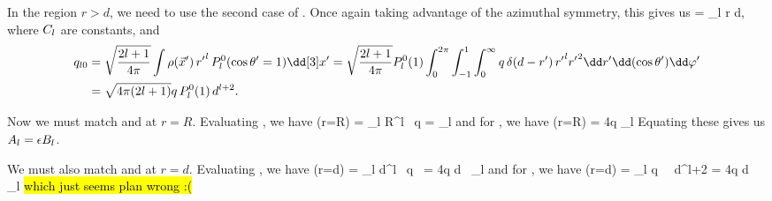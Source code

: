 \begin{solution}
	In the region $r > d$, we need to use the second case of .  Once again taking advantage of the azimuthal symmetry, this gives us
	\beqn \label{C}
		\phix = \sum_l \Cl {}  \Ylotv \quad \tif r \geq d,
	\eeqn
	where $C_l$ are constants, and
	\begin{align*}
		q_{l 0} &= \sqrt{\frac{2l + 1}{4\pi}} \int \rhoxp \, {r'}^l \, P_l^0(\cost' = 1) \dcxp
		= \sqrt{\frac{2l + 1}{4\pi}} \Ploq \intotp \intono \intoi q \,\delta(d - r') \, {r'}^l {r'}^2 \drp \dctp \dvp \\
		&= \sqrt{4\pi (2l + 1)} q \, \Ploq \, d^{l+2}.
	\end{align*}
	
	
	
	Now we must match  and  at $r = R$.  Evaluating , we have
	\beq
		\evphi\!(r=R) = \fe \sum_l \Al {} R^l \, \Ylotv {} q 
		=  \Ploq \sum_l \Al {}  \Ylotv
	\eeq
	and for , we have
	\beq
		\phi(r=R) = 4\pi q \Ploq \sum_l \Bl {}  \Ylotv
	\eeq
	Equating these gives us $A_l = \epsilon B_l$.
	
	We must also match  and  at $r = d$.  Evaluating , we have
	\beq
		\phi(r=d) = \sum_l \Bl {} d^l \,  q  \, \Ylotv
		= 4\pi q d \, \Ploq \sum_l \Bl {} \Ylotv
	\eeq
	and for , we have
	\beq
		\phi(r=d) = \sum_l \Cl {}   q \, \Ploq \, d^{l+2} \Ylotv
		= 4\pi q d \, \Ploq \sum_l \Cl {} \Ylotv
	\eeq
	\hl{which just seems plan wrong :(}
	
\end{solution}